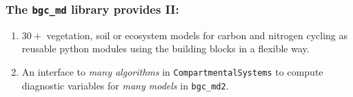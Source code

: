 \documentclass[unknownkeysallowed,usepdftitle=false]{beamer}
\begin{document}
\begin{frame}
  \frametitle{The \texttt{bgc\_md} library provides II:}
  
  \begin{enumerate}
    \item
    $30+$ vegetation, soil or ecosystem models for carbon and nitrogen cycling
      as reusable python modules using the building blocks in a flexible way. 
    \item 
      An interface to \emph{many  algorithms} in \texttt{CompartmentalSystems} to compute diagnostic variables
      for \emph{many models} in \texttt{bgc\_md2}.
  \end{enumerate}
\end{frame}
\end{document}
